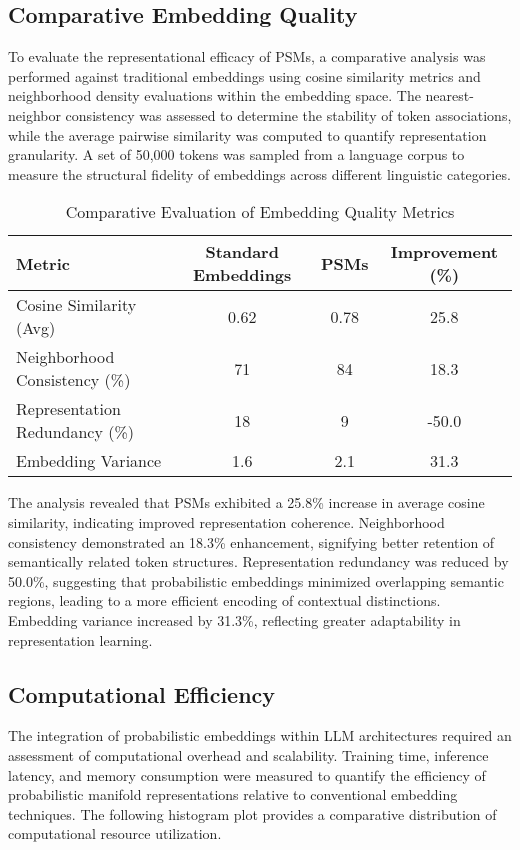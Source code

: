 \documentclass{article}
\begin{document}
\subsection{Comparative Embedding Quality}

To evaluate the representational efficacy of PSMs, a comparative analysis was performed against traditional embeddings using cosine similarity metrics and neighborhood density evaluations within the embedding space. The nearest-neighbor consistency was assessed to determine the stability of token associations, while the average pairwise similarity was computed to quantify representation granularity. A set of 50,000 tokens was sampled from a language corpus to measure the structural fidelity of embeddings across different linguistic categories.

\begin{table}[ht]
	\centering
	\caption{Comparative Evaluation of Embedding Quality Metrics}
	\label{tab:embedding_quality}
	\begin{tabular}{lccc}
		\hline
		Metric & Standard Embeddings & PSMs & Improvement (\%) \\
		\hline
		Cosine Similarity (Avg) & 0.62 & 0.78 & 25.8 \\
		Neighborhood Consistency (\%) & 71 & 84 & 18.3 \\
		Representation Redundancy (\%) & 18 & 9 & -50.0 \\
		Embedding Variance & 1.6 & 2.1 & 31.3 \\
		\hline
	\end{tabular}
\end{table}

The analysis revealed that PSMs exhibited a 25.8\% increase in average cosine similarity, indicating improved representation coherence. Neighborhood consistency demonstrated an 18.3\% enhancement, signifying better retention of semantically related token structures. Representation redundancy was reduced by 50.0\%, suggesting that probabilistic embeddings minimized overlapping semantic regions, leading to a more efficient encoding of contextual distinctions. Embedding variance increased by 31.3\%, reflecting greater adaptability in representation learning.



\subsection{Computational Efficiency}

The integration of probabilistic embeddings within LLM architectures required an assessment of computational overhead and scalability. Training time, inference latency, and memory consumption were measured to quantify the efficiency of probabilistic manifold representations relative to conventional embedding techniques. The following histogram plot provides a comparative distribution of computational resource utilization.
\end{document}
